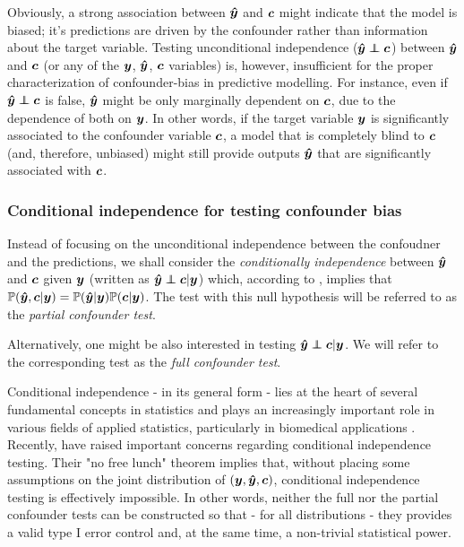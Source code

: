 \documentclass{article}
\begin{document}
Obviously, a strong association between $\boldsymbol{\hat{y}}$ and $\boldsymbol{c}$ might indicate that the model is biased; it's predictions are driven by the confounder rather than information about the target variable.
Testing unconditional independence ($\yhat \independent \c$) between $\boldsymbol{\hat{y}}$ and $\boldsymbol{c}$ (or any of the $\boldsymbol{y}$, $\boldsymbol{\hat{y}}$, $\boldsymbol{c}$ variables) is, however, insufficient for the proper characterization of confounder-bias in predictive modelling.
For instance, even if $\yhat \independent \c$ is false, $\boldsymbol{\hat{y}}$ might be only marginally dependent on $\boldsymbol{c}$, due to the dependence of both on $\boldsymbol{y}$. In other words, if the target variable $\boldsymbol{y}$ is significantly associated to the confounder variable $\boldsymbol{c}$, a model that is completely blind to $\boldsymbol{c}$ (and, therefore, unbiased) might still provide outputs $\boldsymbol{\hat{y}}$ that are significantly associated with $\boldsymbol{c}$.

\subsubsection*{Conditional independence for testing confounder bias}

Instead of focusing on the unconditional independence between the confoudner and the predictions, we shall consider the \emph{conditionally independence} between $\boldsymbol{\hat{y}}$ and $\boldsymbol{c}$ given $\boldsymbol{y}$ (written as $\yhat \independent \c | \y$) which, according to \cite{dawid1979conditional}, implies that $\mathbb{P}(\boldsymbol{\hat{y}}, \boldsymbol{c}|\boldsymbol{y}) = \mathbb{P}(\boldsymbol{\hat{y}}|\boldsymbol{y})\mathbb{P}(\boldsymbol{c}|\boldsymbol{y})$. The test with this null hypothesis will be referred to as the \emph{partial confounder test}.

Alternatively, one might be also interested in testing $\yhat \independent \c | \y$. We will refer to the corresponding test as the \emph{full confounder test}.

 Conditional independence - in its general form - lies at the heart of several fundamental concepts in statistics and  plays an increasingly important role in various fields of applied statistics, particularly in biomedical applications \citep{spirtes2000causation, peters2016causal, fiedler2011mediation, candes2016panning}. Recently, \cite{shah2020hardness} have raised important concerns regarding conditional independence testing.
 Their "no free lunch" theorem implies that, without placing some assumptions on the joint distribution of $(\boldsymbol{y}, \boldsymbol{\hat{y}}, \boldsymbol{c})$, conditional independence testing is effectively impossible. In other words, neither the full nor the partial confounder tests can be constructed so that - for all distributions - they provides a valid type I error control and, at the same time, a non-trivial statistical power.
\end{document}
